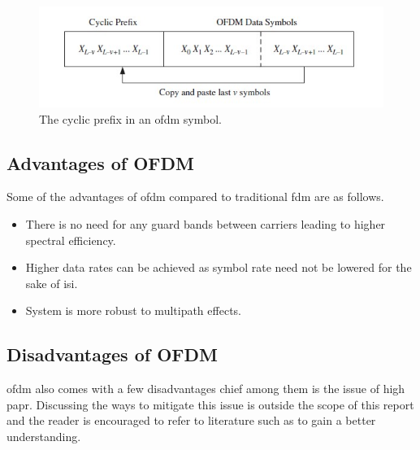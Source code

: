 \begin{figure}[!htbp]
\centering
\includegraphics[scale=1]{Chapter 2/Figures/Cyclic Prefix}
\caption[Cyclic Prefix]{The cyclic prefix in an \acrshort{ofdm} symbol.}
\label{fig:ofdm cyclic prefix}
\end{figure}



\subsection{Advantages of OFDM}
Some of the advantages of \acrshort{ofdm} compared to traditional \acrshort{fdm} are as follows.
\begin{itemize}
\item There is no need for any guard bands between carriers leading to higher spectral efficiency.
\item Higher data rates can be achieved as symbol rate need not be lowered for the sake of \acrshort{isi}.
\item System is more robust to multipath effects.
\end{itemize}

\subsection{Disadvantages of OFDM}
\acrshort{ofdm} also comes with a few disadvantages chief among them is the issue of high \acrshort{papr}. Discussing the ways to mitigate this issue is outside the scope of this report and the reader is encouraged to refer to literature such as \parencite{Ghosh2010} to gain a better understanding.

